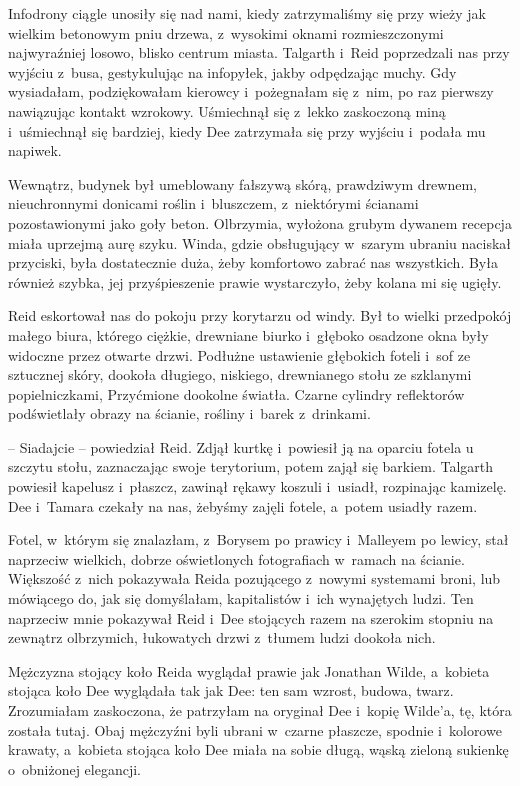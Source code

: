 \documentclass[oneside,polish,11pt,sfheadings]{mwbk}
\begin{document}
Infodrony ciągle unosiły się nad nami, kiedy zatrzymaliśmy się przy
wieży jak wielkim betonowym pniu drzewa, z~wysokimi oknami
rozmieszczonymi najwyraźniej losowo, blisko centrum miasta. Talgarth i~Reid poprzedzali nas przy wyjściu z~busa, gestykulując na infopyłek,
jakby odpędzając muchy. Gdy wysiadałam, podziękowałam kierowcy i~pożegnałam się z~nim, po raz pierwszy nawiązując kontakt wzrokowy.
Uśmiechnął się z~lekko zaskoczoną miną i~uśmiechnął się bardziej, kiedy
Dee zatrzymała się przy wyjściu i~podała mu napiwek.

Wewnątrz, budynek był umeblowany fałszywą skórą, prawdziwym drewnem,
nieuchronnymi donicami roślin i~bluszczem, z~niektórymi ścianami
pozostawionymi jako goły beton. Olbrzymia, wyłożona grubym dywanem
recepcja miała uprzejmą aurę szyku. Winda, gdzie obsługujący w~szarym
ubraniu naciskał przyciski, była dostatecznie duża, żeby komfortowo
zabrać nas wszystkich. Była również szybka, jej przyśpieszenie prawie
wystarczyło, żeby kolana mi się ugięły.

Reid eskortował nas do pokoju przy korytarzu od windy. Był to wielki
przedpokój małego biura, którego ciężkie, drewniane biurko i~głęboko
osadzone okna były widoczne przez otwarte drzwi. Podłużne ustawienie
głębokich foteli i~sof ze sztucznej skóry, dookoła długiego, niskiego,
drewnianego stołu ze szklanymi popielniczkami, Przyćmione dookolne
światła. Czarne cylindry reflektorów podświetlały obrazy na ścianie,
rośliny i~barek z~drinkami.

-- Siadajcie -- powiedział Reid. Zdjął kurtkę i~powiesił ją na oparciu
fotela u szczytu stołu, zaznaczając swoje terytorium, potem zajął się
barkiem. Talgarth powiesił kapelusz i~płaszcz, zawinął rękawy koszuli i~usiadł, rozpinając kamizelę. Dee i~Tamara czekały na nas, żebyśmy zajęli
fotele, a~potem usiadły razem.

Fotel, w~którym się znalazłam, z~Borysem po prawicy i~Malleyem po
lewicy, stał naprzeciw wielkich, dobrze oświetlonych fotografiach w~ramach na ścianie. Większość z~nich pokazywała Reida pozującego z~nowymi
systemami broni, lub mówiącego do, jak się domyślałam, kapitalistów i~ich wynajętych ludzi. Ten naprzeciw mnie pokazywał Reid i~Dee stojących
razem na szerokim stopniu na zewnątrz olbrzymich, łukowatych drzwi z~tłumem ludzi dookoła nich.

Mężczyzna stojący koło Reida wyglądał prawie jak Jonathan Wilde, a~kobieta stojąca koło Dee wyglądała tak jak Dee: ten sam wzrost, budowa,
twarz. Zrozumiałam zaskoczona, że patrzyłam na oryginał Dee i~kopię
Wilde'a, tę, która została tutaj. Obaj mężczyźni byli ubrani w~czarne
płaszcze, spodnie i~kolorowe krawaty, a~kobieta stojąca koło Dee miała
na sobie długą, wąską zieloną sukienkę o~obniżonej elegancji.
\end{document}

